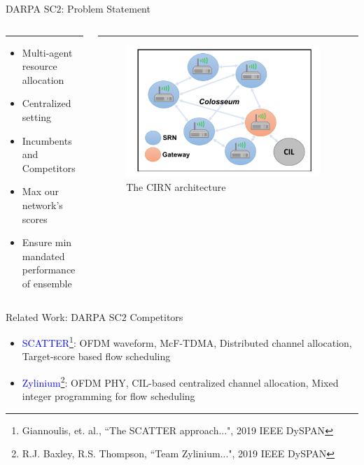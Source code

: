 \documentclass{beamer}
\begin{document}
\begin{frame}{DARPA SC$2$: Problem Statement}
\begin{columns}[T]
\begin{column}{0.55\textwidth}
\color{blue}\rule{\linewidth}{4pt}
\begin{itemize}
    \item Multi-agent resource allocation
    \item Centralized setting
    \item Incumbents and Competitors
    \item Max our network's scores
    \item Ensure min mandated performance of ensemble
\end{itemize}
\end{column}%
\hfill%
\begin{column}{0.65\textwidth}
\color{magenta}\rule{\linewidth}{4pt}
\begin{figure}
    \centering
    \includegraphics[width = 0.95\textwidth]{BAM!_Wireless_Architecture.PNG}
    \caption{The CIRN architecture}
    \label{fig:1}
\end{figure}
\end{column}%
\end{columns}
\end{frame}
\begin{frame}{Related Work: DARPA SC$2$ Competitors}
\begin{itemize}
      \item \textcolor{blue}{SCATTER}\footnote{\tiny{Giannoulis, et. al., ``The SCATTER approach...", 2019 IEEE DySPAN}}: OFDM waveform, McF-TDMA, Distributed channel allocation, Target-score based flow scheduling
      \item \textcolor{blue}{Zylinium}\footnote{\tiny{R.J. Baxley, R.S. Thompson, ``Team Zylinium...", 2019 IEEE DySPAN}}: OFDM PHY, CIL-based centralized channel allocation, Mixed integer programming for flow scheduling
\end{itemize}
\end{frame}
\end{document}
